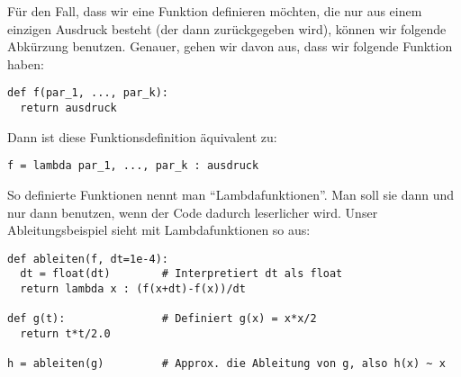 Für den Fall, dass wir eine Funktion definieren möchten, die nur aus einem einzigen Ausdruck besteht (der dann zurückgegeben wird), können wir folgende Abkürzung benutzen.
Genauer, gehen wir davon aus, dass wir folgende Funktion haben:
\begin{lstlisting}
def f(par_1, ..., par_k):
  return ausdruck
\end{lstlisting}
Dann ist diese Funktionsdefinition äquivalent zu:
\begin{lstlisting}
f = lambda par_1, ..., par_k : ausdruck
\end{lstlisting}
So definierte Funktionen nennt man ``Lambdafunktionen''.
Man soll sie dann und nur dann benutzen, wenn der Code dadurch leserlicher wird.
Unser Ableitungsbeispiel sieht mit Lambdafunktionen so aus:
\begin{lstlisting}
def ableiten(f, dt=1e-4):
  dt = float(dt)        # Interpretiert dt als float
  return lambda x : (f(x+dt)-f(x))/dt

def g(t):               # Definiert g(x) = x*x/2
  return t*t/2.0

h = ableiten(g)         # Approx. die Ableitung von g, also h(x) ~ x
\end{lstlisting}


